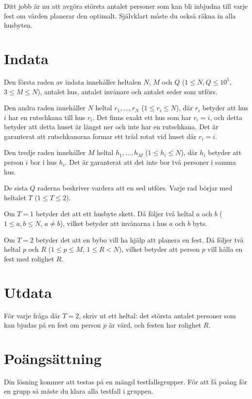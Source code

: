 Ditt jobb är nu att avgöra största antalet personer som kan bli inbjudna till varje fest om värden planerar den optimalt.
Självklart måste du också räkna in alla husbyten.


\section*{Indata}
Den första raden av indata innehåller heltalen $N$, $M$ och $Q$ ($1 \leq N, Q \leq 10^5$, $3 \leq M \leq N$),
antalet hus, antalet invånare och antalet seder som utförs.

Den andra raden innehåller $N$ heltal $r_1, \dots, r_N$ ($1 \leq r_i \leq N$),
där $r_i$ betyder att hus $i$ har en rutschkana till hus $r_i$.
Det finns exakt ett hus som har $r_i=i$, och detta betyder att detta huset är längst ner och inte har en rutschkana.
Det är garanterat att rutschkanorna formar ett träd rotat vid huset där $r_i=i$.

Den tredje raden innehåller $M$ heltal $h_1, \dots, h_M$ ($1 \leq h_i \leq N$),
där $h_i$ betyder att person $i$ bor i hus $h_i$.
Det är garanterat att det inte bor två personer i samma hus.

De sista $Q$ raderna beskriver vardera att en sed utförs. Varje rad börjar med heltalet $T$ ($1 \leq T \leq 2$).

Om $T=1$ betyder det att ett husbyte skett. Då följer två heltal $a$ och $b$ ($1 \leq a, b \leq N$, $a \neq b$),
vilket betyder att invånarna i hus $a$ och $b$ byts.

Om $T=2$ betyder det att en bybo vill ha hjälp att planera en fest. Då följer två heltal $p$ och $R$ ($1 \leq p \leq M$, $1 \leq R < N$),
vilket betyder att person $p$ vill hålla en fest med rolighet $R$.

\section*{Utdata}
För varje fråga där $T=2$, skriv ut ett heltal: det största antalet personer som kan bjudas på en fest
om person $p$ är värd, och festen har rolighet $R$.

\section*{Poängsättning}
Din lösning kommer att testas på en mängd testfallsgrupper.
För att få poäng för en grupp så måste du klara alla testfall i gruppen.


